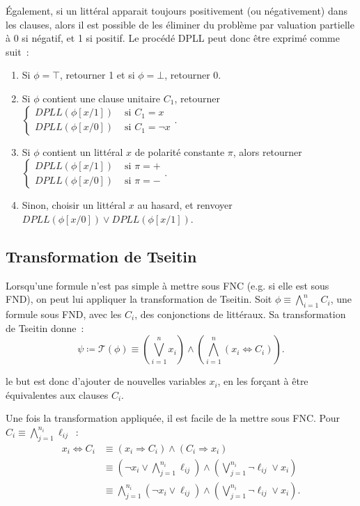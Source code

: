 \documentclass{article}
\theoremstyle{definition}
\theoremstyle{remark}
\begin{document}
	Également, si un littéral apparait toujours positivement (ou négativement) dans les clauses, alors il est possible de les éliminer du problème par valuation
	partielle à 0 si négatif, et 1 si positif. Le procédé DPLL peut donc être exprimé comme suit~:
	\begin{enumerate}
		\item Si $\phi = \top$, retourner 1 et si $\phi = \bot$, retourner 0.
		\item Si $\phi$ contient une clause unitaire $C_1$, retourner
			$\begin{cases}DPLL(\phi[x/1]) &\text{ si } C_1 = x \\DPLL(\phi[x/0]) &\text{ si } C_1 = \lnot x\end{cases}$.
		\item Si $\phi$ contient un littéral $x$ de polarité constante $\pi$, alors retourner
			$\begin{cases}DPLL(\phi[x/1]) &\text{ si } \pi=+\\DPLL(\phi[x/0]) &\text{ si } \pi=-\end{cases}$.
			\item Sinon, choisir un littéral $x$ au hasard, et renvoyer $DPLL(\phi[x/0]) \lor DPLL(\phi[x/1])$.
	\end{enumerate}

	\subsection{Transformation de Tseitin}
		Lorsqu'une formule n'est pas simple à mettre sous FNC (e.g. si elle est sous FND), on peut lui appliquer la transformation de Tseitin.
		Soit $\phi \equiv \bigwedge_{i=1}^nC_i$, une formule sous FND, avec les $C_i$, des conjonctions de littéraux. Sa transformation de Tseitin
		donne~:
		\[\psi \coloneqq \mathscr T(\phi) \equiv \left(\bigvee_{i=1}^nx_i\right) \land \left(\bigwedge_{i=1}^n\left(x_i \Leftrightarrow C_i\right)\right).\]

		le but est donc d'ajouter de nouvelles variables $x_i$, en les forçant à être équivalentes aux clauses $C_i$.

		Une fois la transformation appliquée, il est facile de la mettre sous FNC. Pour $C_i \equiv \bigwedge_{j=1}^{n_i}\ell_{ij}$~:
		\begin{align*}
			x_i \Leftrightarrow C_i &\equiv (x_i \Rightarrow C_i) \land (C_i \Rightarrow x_i) \\
			&\equiv \left(\lnot x_i \lor \bigwedge_{j=1}^{n_i}\ell_{ij}\right) \land \left(\bigvee_{j=1}^{n_i}\lnot \ell_{ij} \lor x_i\right) \\
			&\equiv \bigwedge_{j=1}^{n_i}(\lnot x_i \lor \ell_{ij}) \land \left(\bigvee_{j=1}^{n_i}\lnot \ell_{ij} \lor x_i\right).
		\end{align*}
\end{document}
